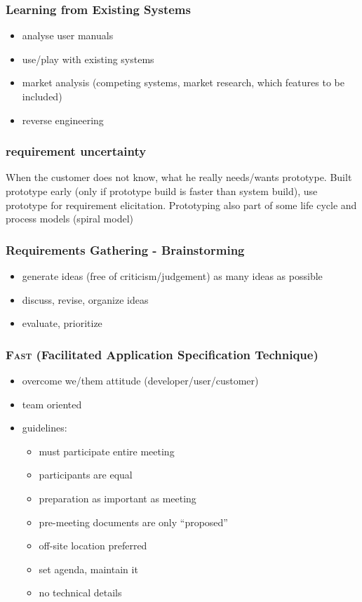 \documentclass[a4paper, 10pt]{article}
\begin{document}
\subsubsection{Learning from Existing Systems}
\begin{itemize}
	\item analyse user manuals
	\item use/play with existing systems
	\item market analysis (competing systems, market research, which features to be included)
	\item reverse engineering
\end{itemize}

\subsubsection{requirement uncertainty}
When the customer does not know, what he really needs/wants \follows prototype.
Built prototype early (only if prototype build is faster than system build),
use prototype for requirement elicitation.
Prototyping also part of some life cycle and process models (spiral model)

\subsubsection{Requirements Gathering - Brainstorming}
\begin{itemize}
	\item generate ideas (free of criticism/judgement) \follows as many ideas as possible
	\item discuss, revise, organize ideas
	\item evaluate, prioritize
\end{itemize}

\subsubsection{\textsc{Fast} (Facilitated Application Specification Technique)}
\begin{itemize}
	\item overcome we/them attitude (developer/user/customer)
	\item team oriented
	\item guidelines:
		\begin{itemize}
			\item must participate entire meeting
			\item participants are equal
			\item preparation as important as meeting
			\item pre-meeting documents are only ``proposed''
			\item off-site location preferred
			\item set agenda, maintain it
			\item no technical details
		\end{itemize}
\end{itemize}
\end{document}
